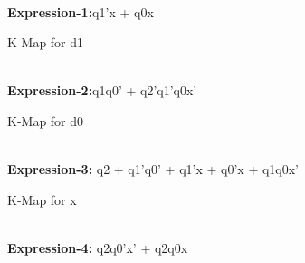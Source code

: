 \documentclass[10pt,a4paper]{report}
\begin{document}
\begin{multicols}{2}
\begin{Karnaugh}
       
    \end{Karnaugh}
\\ \centering  \textbf{Expression-1:}\hspace{2mm}q1'x + q0x\\   \vspace{3mm}
 \raggedright K-Map for d1
 \center   \begin{Karnaugh}
    \end{Karnaugh}
\\ \centering \textbf{Expression-2:}\hspace{2mm}q1q0' + q2'q1'q0x'  \\ \vspace{3mm}
   \raggedright K-Map for d0
    \center \begin{Karnaugh}
    \end{Karnaugh}  
\\ \centering \textbf{Expression-3:}\hspace{2mm} q2 + q1'q0' + q1'x + q0'x + q1q0x'\\  \vspace{3mm}
\raggedright K-Map for x
 \center \begin{Karnaugh}
       
    \end{Karnaugh}
    \\ \centering \textbf{Expression-4:}\hspace{2mm} q2q0'x' + q2q0x\\ 
    \vspace{5mm}



\end{multicols}
\end{document}
